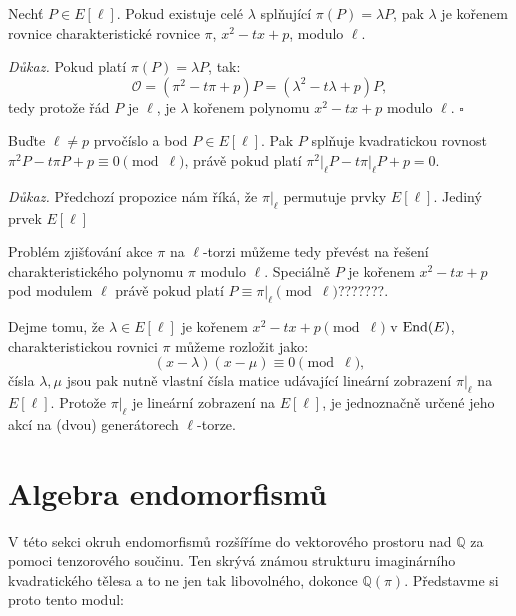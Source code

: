 \documentclass[12pt]{report}
\begin{document}
\begin{dusledek}
Nechť $P \in E[\ell]$. Pokud existuje celé $\lambda$ splňující $\pi (P) = \lambda P$, pak $\lambda$ je kořenem rovnice charakteristické rovnice $\pi$, $x^2 - tx + p$, modulo $\ell$. 
\end{dusledek}
\noindent \textit{Důkaz.} Pokud platí $\pi(P) = \lambda P$, tak:
\begin{equation*}
\mathcal{O} = (\pi^2 - t \pi + p)P = (\lambda ^ 2 - t \lambda + p)P,
\end{equation*}
tedy protože řád $P$ je $\ell$, je $\lambda$ kořenem polynomu $x^2 - tx + p$ modulo $\ell$. \hfill $\square$\\


\begin{dusledek}
Buďte $\ell \neq p$ prvočíslo a bod $P \in E[\ell]$. Pak $P$ splňuje kvadratickou rovnost $\pi ^2 P - t \pi P + p \equiv 0 \pmod{\ell}$, právě pokud platí $\pi^2 \vert_{\ell} P - t \pi \vert_{\ell} P + p = 0$.
\end{dusledek}

\noindent \textit{Důkaz.} Předchozí propozice nám říká, že $\pi \vert_{\ell}$ permutuje prvky $E[\ell]$. Jediný prvek $E[\ell]$ 

Problém zjišťování akce $\pi$ na $\ell$-torzi můžeme tedy převést na řešení charakteristického polynomu $\pi$ modulo $\ell$. Speciálně $P$ je kořenem $x^2 - t x + p$ pod modulem $\ell$ právě pokud platí $P \equiv \pi \vert_{\ell} \pmod{\ell}$???????.

Dejme tomu, že $\lambda \in E[\ell]$ je kořenem $x^2 - tx + p \pmod{\ell}$ v $\operatorname{End}(E)$, charakteristickou rovnici $\pi$ můžeme rozložit jako:
\begin{equation*}
(x - \lambda)(x - \mu) \equiv 0 \pmod{\ell},
\end{equation*}
čísla $\lambda,\mu$ jsou pak nutně vlastní čísla matice udávající lineární zobrazení $\pi \vert_{\ell}$ na $E[\ell]$. Protože $\pi \vert _{\ell}$ je lineární zobrazení na $E[\ell]$, je jednoznačně určené jeho akcí na (dvou) generátorech $\ell$-torze. 


\section{Algebra endomorfismů}

V této sekci okruh endomorfismů rozšíříme do vektorového prostoru nad $\mathbb{Q}$ za pomoci tenzorového součinu. Ten skrývá známou strukturu imaginárního kvadratického tělesa a to ne jen tak libovolného, dokonce $\mathbb{Q}(\pi)$. Představme si proto tento modul:
\end{document}
